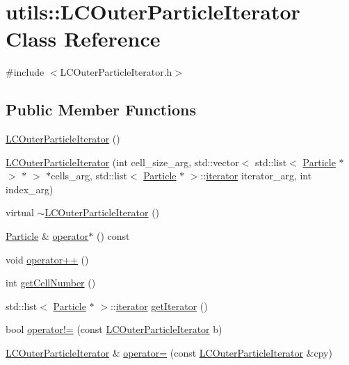 \hypertarget{classutils_1_1LCOuterParticleIterator}{\section{utils\-:\-:L\-C\-Outer\-Particle\-Iterator Class Reference}
\label{classutils_1_1LCOuterParticleIterator}
}


{\ttfamily \#include $<$L\-C\-Outer\-Particle\-Iterator.\-h$>$}

\subsection*{Public Member Functions}
\begin{DoxyCompactItemize}
\item 
\hyperlink{classutils_1_1LCOuterParticleIterator_a9ac0d0f665d39b1cd9ffd3e9f07e5155}{L\-C\-Outer\-Particle\-Iterator} ()
\item 
\hyperlink{classutils_1_1LCOuterParticleIterator_ab399d6d6b97cb09e53217d9654ae9a64}{L\-C\-Outer\-Particle\-Iterator} (int cell\-\_\-size\-\_\-arg, std\-::vector$<$ std\-::list$<$ \hyperlink{classParticle}{Particle} $\ast$ $>$ $\ast$ $>$ $\ast$cells\-\_\-arg, std\-::list$<$ \hyperlink{classParticle}{Particle} $\ast$ $>$\-::\hyperlink{classutils_1_1LCOuterParticleIterator_ab01cb9c518e6f5e97b4b99b8a1af88e5}{iterator} iterator\-\_\-arg, int index\-\_\-arg)
\item 
virtual \hyperlink{classutils_1_1LCOuterParticleIterator_a3a66099197abb8723e1bd546cdbdafb5}{$\sim$\-L\-C\-Outer\-Particle\-Iterator} ()
\item 
\hyperlink{classParticle}{Particle} \& \hyperlink{classutils_1_1LCOuterParticleIterator_acaf99d121ac0d78370bbc479a7c6448d}{operator$\ast$} () const 
\item 
void \hyperlink{classutils_1_1LCOuterParticleIterator_a8257913f53e484b3e544882a53571d05}{operator++} ()
\item 
int \hyperlink{classutils_1_1LCOuterParticleIterator_a31776769fce3238c1d76a442000f2b23}{get\-Cell\-Number} ()
\item 
std\-::list$<$ \hyperlink{classParticle}{Particle} $\ast$ $>$\-::\hyperlink{classutils_1_1LCOuterParticleIterator_ab01cb9c518e6f5e97b4b99b8a1af88e5}{iterator} \hyperlink{classutils_1_1LCOuterParticleIterator_add4758ecb5c0da6b60d0105b7b497b80}{get\-Iterator} ()
\item 
bool \hyperlink{classutils_1_1LCOuterParticleIterator_a8ca9661e34d7a0750544b6bc211c87be}{operator!=} (const \hyperlink{classutils_1_1LCOuterParticleIterator}{L\-C\-Outer\-Particle\-Iterator} b)
\item 
\hyperlink{classutils_1_1LCOuterParticleIterator}{L\-C\-Outer\-Particle\-Iterator} \& \hyperlink{classutils_1_1LCOuterParticleIterator_afcaf7fb20f9711329a011af367bec64c}{operator=} (const \hyperlink{classutils_1_1LCOuterParticleIterator}{L\-C\-Outer\-Particle\-Iterator} \&cpy)
\end{DoxyCompactItemize}
